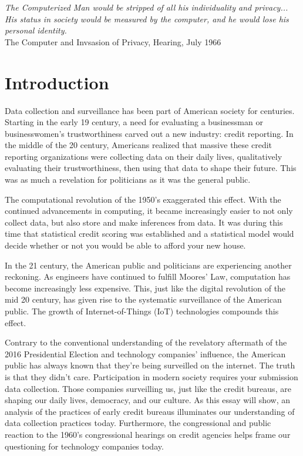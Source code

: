 \begin{center}
\textit{
The Computerized Man would be stripped of all his individuality and privacy...
His status in society would be measured by the computer,
and he would lose his personal identity.} \\
The Computer and Invsasion of Privacy, Hearing, July 1966
\end{center}

\section{Introduction}

Data collection and surveillance has been part of American society for centuries.
Starting in the early 19 century, a need for evaluating a businessman or businesswomen's
trustworthiness carved out a new industry: credit reporting.
In the middle of the 20 century, Americans realized that massive these credit reporting
organizations were collecting data on their daily lives, qualitatively
evaluating their trustworthiness, then using that data to shape their future.
This was as much a revelation for politicians as it was the general public.


The computational revolution of the 1950's exaggerated this effect. With the
continued advancements in computing, it became increasingly easier to
not only collect data, but also store and make inferences from data. It was
during this time that statistical credit scoring was established and a
statistical model would decide whether or not you would be able to afford your
new house.

In the 21 century, the American public and politicians are experiencing
another reckoning. As engineers have continued to fulfill Moores' Law,
computation has become increasingly less expensive. This, just like the digital
revolution of the mid 20 century, has given rise to the systematic
surveillance of the American public. The growth of Internet-of-Things (IoT)
technologies compounds this effect.

Contrary to the conventional understanding of the revelatory aftermath of the
2016 Presidential Election and technology companies' influence, the American
public has always known that they're being surveilled on the internet. The
truth is that they didn't care. Participation in modern society requires your
submission data collection. Those companies surveilling us, just like the
credit bureaus, are shaping our daily lives, democracy, and our culture. As
this essay will show, an analysis of the practices of early credit bureaus
illuminates our understanding of data collection practices today. Furthermore,
the congressional and public reaction to the 1960's congressional hearings on
credit agencies helps frame our questioning for technology companies today.

